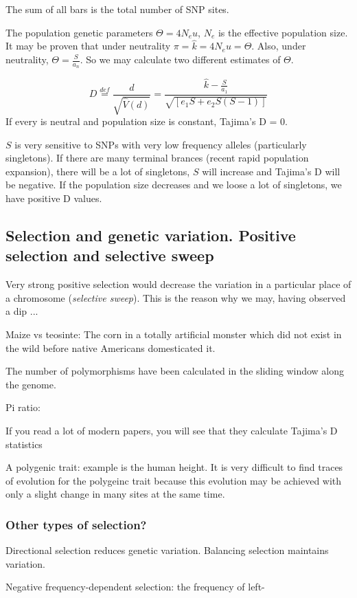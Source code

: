 \documentclass[main.tex]{subfiles}
\begin{document}
The sum of all bars is the total number of SNP sites.

The population genetic parameters $ \Theta = 4 N_e u $, $ N_e $ is the effective population size.
It may be proven that under neutrality $ \pi = \hat k = 4 N_e u = \Theta $.
Also, under neutrality, $ \Theta = \frac{S}{a_n} $.
So we may calculate two different estimates of $ \Theta $.

\[ D \overset{def}= \frac{d}{\sqrt{\hat V (d)}} = \frac{\hat k - \frac{S}{a_1}}{\sqrt{[ e_1 S + e_2 S (S - 1) ]}} \]
If every is neutral and population size is constant, Tajima's D = 0.

$ S $ is very sensitive to SNPs with very low frequency alleles (particularly singletons).
If there are many terminal brances (recent rapid population expansion), there will be a lot of singletons, $ S $ will increase and Tajima's D will be negative.
If the population size decreases and we loose a lot of singletons, we have positive D values.

\subsection{Selection and genetic variation. Positive selection and selective sweep}

Very strong positive selection would decrease the variation in a particular place of a chromosome (\emph{selective sweep}).
This is the reason why we may, having observed a dip ...

Maize vs teosinte:
The corn in a totally artificial monster which did not exist in the wild before native Americans domesticated it.

The number of polymorphisms have been calculated in the sliding window along the genome.

Pi ratio:

If you read a lot of modern papers, you will see that they calculate Tajima's D statistics


A polygenic trait: example is the human height.
It is very difficult to find traces of evolution for the polygeinc trait because this evolution may be achieved with only a slight change in many sites at the same time.

\subsubsection{Other types of selection?}

Directional selection reduces genetic variation.
Balancing selection maintains variation.

Negative frequency-dependent selection:
the frequency of left-
\end{document}
